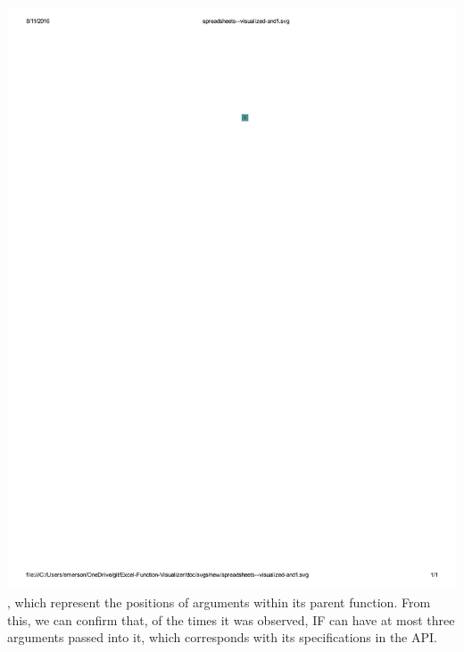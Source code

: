 \documentclass[conference]{IEEEtran}
\begin{document}
	\includegraphics{glossary-blue}, which represent the positions of arguments
	within its parent function. From this, we can confirm that, of the times it was
	observed, IF can have at most three arguments passed into it, which corresponds
	with its specifications in the
	API. \par
	
\end{document}
